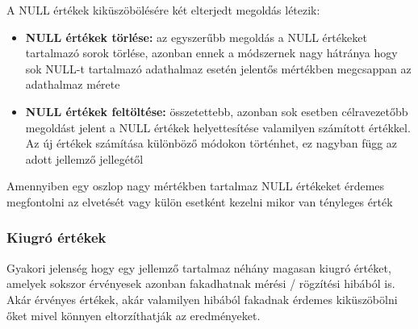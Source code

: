 A NULL értékek kiküszöbölésére két elterjedt megoldás létezik:
\begin{itemize}
	\item \textbf{NULL értékek törlése:} az egyszerűbb megoldás a NULL értékeket tartalmazó sorok törlése, azonban ennek a módszernek nagy hátránya hogy sok NULL-t tartalmazó adathalmaz esetén jelentős mértékben megcsappan az adathalmaz mérete
	\item \textbf{NULL értékek feltöltése:} összetettebb, azonban sok esetben célravezetőbb megoldást jelent a NULL értékek helyettesítése valamilyen számított értékkel. Az új értékek számítása különböző módokon történhet, ez nagyban függ az adott jellemző jellegétől
\end{itemize}
Amennyiben egy oszlop nagy mértékben tartalmaz NULL értékeket érdemes megfontolni az elvetését vagy külön esetként kezelni mikor van tényleges érték


\subsubsection{Kiugró értékek}
Gyakori jelenség hogy egy jellemző tartalmaz néhány magasan kiugró értéket, amelyek sokszor érvényesek azonban fakadhatnak mérési / rögzítési hibából is. Akár érvényes értékek, akár valamilyen hibából fakadnak érdemes kiküszöbölni őket mivel könnyen eltorzíthatják az eredményeket. 

